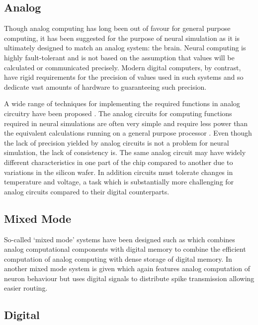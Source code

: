 		\subsection{Analog}
		
			Though analog computing has long been out of favour for general purpose
			computing, it has been suggested for the purpose of neural simulation as
			it is ultimately designed to match an analog system: the brain. Neural
			computing is highly fault-tolerant and is not based on the assumption
			that values will be calculated or communicated precisely. Modern digital
			computers, by contrast, have rigid requirements for the precision of
			values used in such systems and so dedicate vast amounts of hardware to
			guaranteeing such precision.
			
			A wide range of techniques for implementing the required functions in
			analog circuitry have been proposed
			\cite{graf86,holler89,agranat90,azghadi13}.  The analog circuits for
			computing functions required in neural simulations are often very simple
			and require less power than the equivalent calculations running on a
			general purpose processor \cite{misra10}. Even though the lack of
			precision yielded by analog circuits is not a problem for neural
			simulation, the lack of consistency is. The same analog circuit may have
			widely different characteristics in one part of the chip compared to
			another due to variations in the silicon wafer. In addition circuits
			must tolerate changes in temperature and voltage, a task which is
			substantially more challenging for analog circuits compared to their
			digital counterparts.
		
		\subsection{Mixed Mode}
			
			So-called `mixed mode' systems have been designed such as
			\cite{heittmann02} which combines analog computational components with
			digital memory to combine the efficient computation of analog computing
			with dense storage of digital memory. In \cite{murray91} another mixed
			mode system is given which again features analog computation of neuron
			behaviour but uses digital signals to distribute spike transmission
			allowing easier routing.
		
		\subsection{Digital}
			
